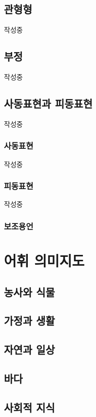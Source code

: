 \documentclass{snu-fl-questionnaire}
\begin{document}
\section{관형형}
작성중

\section{부정}
작성중

\section{사동표현과 피동표현}
작성중

\subsection{사동표현}
작성중

\subsection{피동표현}
작성중

\subsection{보조용언}

\chapter{어휘 의미지도}
\section{농사와 식물}

\section{가정과 생활}

\section{자연과 일상}

\section{바다}
\section{사회적 지식}
\end{document}
